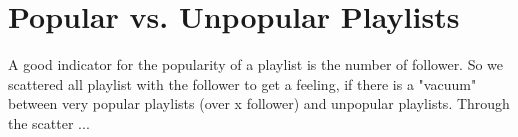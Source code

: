 \section{Popular vs. Unpopular Playlists}
A good indicator for the popularity of a playlist is the number of follower. So we scattered all playlist with the follower to get a feeling, if there is a "vacuum" between very popular playlists (over x follower) and unpopular playlists. Through the scatter ...